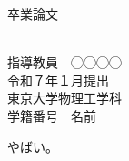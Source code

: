 \documentclass[uplatex,dvipdfmx,a4paper,12pt,12ptj]{jsreport}
\begin{document}
\thispagestyle{empty}
\begin{center}

\vspace{20mm}
{\huge\noindent 卒業論文}\\
\vspace{20mm}
{\huge{}}\\
\medskip
\vspace{20mm}

{\Large\noindent
指導教員　◯◯◯◯    \\
\vspace{\baselineskip}
\vspace{30mm}
{令和７年１月提出}\\
\vspace{20mm}
\hfill 東京大学物理工学科 \\
\hfill 学籍番号　名前\\
}
\vspace{40mm}

\end{center}


\tableofcontents



\cite{yaoChargeTransferEffects2018}やばい。




\end{document}
